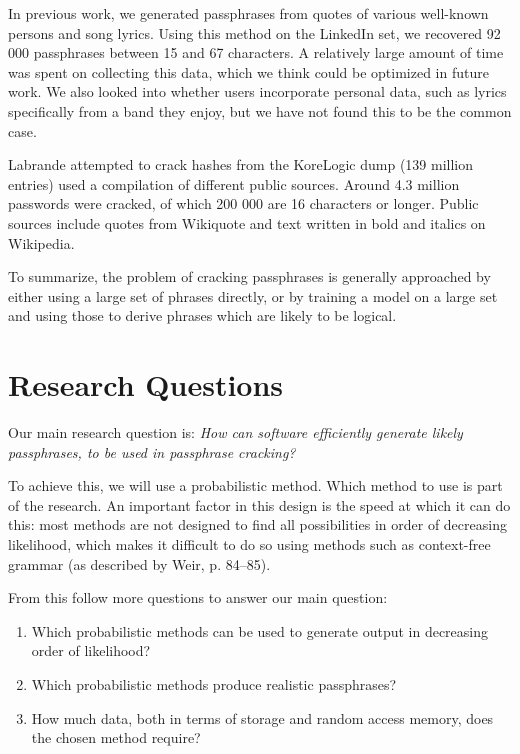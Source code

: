 \documentclass{article}
\begin{document}
In previous work, we\cite{own} generated passphrases from quotes of various
well-known persons and song lyrics. Using this method on the LinkedIn set, we
recovered 92 000 passphrases between 15 and 67 characters. A relatively large
amount of time was spent on collecting this data, which we think could be
optimized in future work. We also looked into whether users incorporate
personal data, such as lyrics specifically from a band they enjoy, but we have
not found this to be the common case.

Labrande\cite{crackmeimfamous} attempted to crack hashes from the KoreLogic
dump (139 million entries) used a compilation of different public sources.
Around 4.3 million passwords were cracked, of which 200 000 are 16 characters
or longer. Public sources include quotes from Wikiquote and text written in
bold and italics on Wikipedia.

To summarize, the problem of cracking passphrases is generally approached by
either using a large set of phrases directly, or by training a model on a large
set and using those to derive phrases which are likely to be logical.


\section{Research Questions}

Our main research question is: {\it How can software efficiently generate
likely passphrases, to be used in passphrase cracking?}

To achieve this, we will use a probabilistic method. Which method to use is
part of the research. An important factor in this design is the speed at which
it can do this: most methods are not designed to find all possibilities in
order of decreasing likelihood, which makes it difficult to do so using methods
such as context-free grammar (as described by Weir\cite{probabilistic-thesis},
p. 84--85).

From this follow more questions to answer our main question:

\begin{enumerate}
	\item Which probabilistic methods can be used to generate output in decreasing order of likelihood?
	\item Which probabilistic methods produce realistic passphrases?
	\item How much data, both in terms of storage and random access memory, does the chosen method require?
\end{enumerate}
\end{document}
